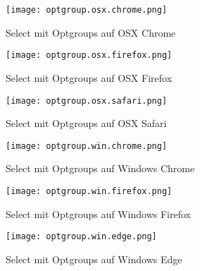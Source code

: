 \begin{figure}[!htb]
    \centering
    \begin{minipage}[b]{0.28\textwidth}
        \centering
        \texttt{[image: optgroup.osx.chrome.png]}
        \caption{\centering Select mit Optgroups auf OSX Chrome}
        \label{img:optgroupOsxChromeSelect}
    \end{minipage}
    \hfill
    \begin{minipage}[b]{0.28\textwidth}
        \centering
        \texttt{[image: optgroup.osx.firefox.png]}
        \caption{\centering Select mit Optgroups auf OSX Firefox}
        \label{img:optgroupOsxFirefoxSelect}
    \end{minipage}
    \hfill
    \begin{minipage}[b]{0.28\textwidth}
        \centering
        \texttt{[image: optgroup.osx.safari.png]}
        \caption{\centering Select mit Optgroups auf OSX Safari}
        \label{img:optgroupOsxSafariSelect}
    \end{minipage}
\end{figure}

\begin{figure}[!htb]
    \centering
    \begin{minipage}[b]{0.28\textwidth}
        \centering
        \texttt{[image: optgroup.win.chrome.png]}
        \caption{\centering Select mit Optgroups auf Windows Chrome}
        \label{img:optgroupWinChromeSelect}
    \end{minipage}
    \hfill
    \begin{minipage}[b]{0.28\textwidth}
        \centering
        \texttt{[image: optgroup.win.firefox.png]}
        \caption{\centering Select mit Optgroups auf Windows Firefox}
        \label{img:optgroupWinFirefoxSelect}
    \end{minipage}
    \hfill
    \begin{minipage}[b]{0.28\textwidth}
        \centering
        \texttt{[image: optgroup.win.edge.png]}
        \caption{\centering Select mit Optgroups auf Windows Edge}
        \label{img:optgroupWinEdgeSelect}
    \end{minipage}
\end{figure}
